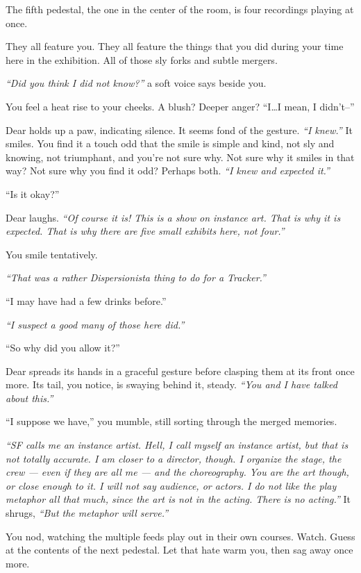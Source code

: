 The fifth pedestal, the one in the center of the room, is four recordings playing at once.

They all feature you. They all feature the things that you did during your time here in the exhibition. All of those sly forks and subtle mergers.

\emph{``Did you think I did not know?''} a soft voice says beside you.

You feel a heat rise to your cheeks. A blush? Deeper anger? ``I\ldots{}I mean, I didn't--''

Dear holds up a paw, indicating silence. It seems fond of the gesture. \emph{``I knew.''} It smiles. You find it a touch odd that the smile is simple and kind, not sly and knowing, not triumphant, and you're not sure why. Not sure why it smiles in that way? Not sure why you find it odd? Perhaps both. \emph{``I knew and expected it.''}

``Is it okay?''

Dear laughs. \emph{``Of course it is! This is a show on instance art. That is why it is expected. That is why there are five small exhibits here, not four.''}

You smile tentatively.

\emph{``That was a rather Dispersionista thing to do for a Tracker.''}

``I may have had a few drinks before.''

\emph{``I suspect a good many of those here did.''}

``So why did you allow it?''

Dear spreads its hands in a graceful gesture before clasping them at its front once more. Its tail, you notice, is swaying behind it, steady. \emph{``You and I have talked about this.''}

``I suppose we have,'' you mumble, still sorting through the merged memories.

\emph{``SF calls me an instance artist. Hell, I call myself an instance artist, but  that is not totally accurate. I am closer to a director, though. I organize the stage, the crew --- even if they are all me --- and the choreography. You are the art though, or close enough to it. I will not say audience, or actors. I do not like the play metaphor all that much, since the art is not in the acting. There is no acting.''}  It shrugs, \emph{``But the metaphor will serve.''}

You nod, watching the multiple feeds play out in their own courses. Watch. Guess at the contents of the next pedestal. Let that hate warm you, then sag away once more.

